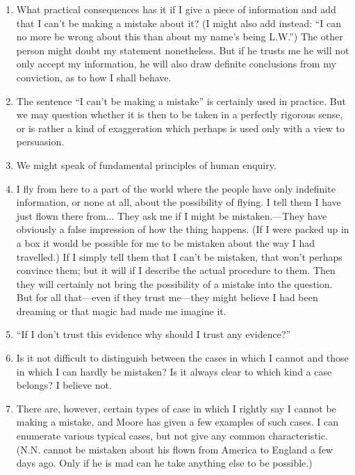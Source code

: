 \documentclass{book}
\begin{document}
\begin{enumerate}
\item
What practical consequences has it if I give a piece of information and add
that I can't be making a mistake about it?  (I might also add instead: ``I can
no more be wrong about this than about my name's being L.W.'') The other person
might doubt my statement nonetheless. But if he trusts me he will not only
accept my information, he will also draw definite conclusions from my
conviction, as to how I shall behave.

\item
The sentence ``I can't be making a mistake'' is certainly used in practice. But
we may question whether it is then to be taken in a perfectly rigorous sense,
or is rather a kind of exaggeration which perhaps is used only with a view to
persuasion.

\item
We might speak of fundamental principles of human enquiry.

\item
I fly from here to a part of the world where the people have only indefinite
information, or none at all, about the possibility of flying. I tell them I
have just flown there from... They ask me if I might be mistaken.---They have
obviously a false impression of how the thing happens. (If I were packed up in
a box it would be possible for me to be mistaken about the way I had
travelled.) If I simply tell them that I can't be mistaken, that won't perhaps
convince them; but it will if I describe the actual procedure to them. Then
they will certainly not bring the possibility of a mistake into the question.
But for all that---even if they trust me---they might believe I had been
dreaming or that magic had made me imagine it.

\item
``If I don't trust this evidence why should I trust any evidence?''

\item
Is it not difficult to distinguish between the cases in which I cannot and
those in which I can hardly be mistaken? Is it always clear to which kind a
case belongs? I believe not.

\item
There are, however, certain types of case in which I rightly say I cannot be
making a mistake, and Moore has given a few examples of such cases.  I can
enumerate various typical cases, but not give any common characteristic. (N.N.
cannot be mistaken about his flown from America to England a few days ago. Only
if he is mad can he take anything else to be possible.)


\end{enumerate}
\end{document}

